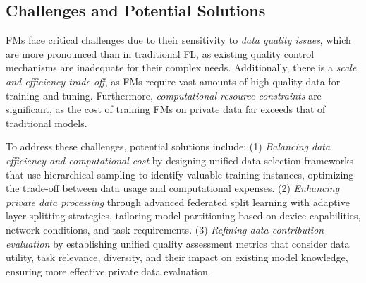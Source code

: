 \subsection{Challenges and Potential Solutions}


FMs face critical challenges due to their sensitivity to \textit{data quality issues}, which are more pronounced than in traditional FL, as existing quality control mechanisms are inadequate for their complex needs. Additionally, there is a \textit{scale and efficiency trade-off}, as FMs require vast amounts of high-quality data for training and tuning. Furthermore, \textit{computational resource constraints} are significant, as the cost of training FMs on private data far exceeds that of traditional models.

To address these challenges, potential solutions include:  
(1) \textit{Balancing data efficiency and computational cost} by designing unified data selection frameworks that use hierarchical sampling to identify valuable training instances, optimizing the trade-off between data usage and computational expenses.  
(2) \textit{Enhancing private data processing} through advanced federated split learning with adaptive layer-splitting strategies, tailoring model partitioning based on device capabilities, network conditions, and task requirements.  
(3) \textit{Refining data contribution evaluation} by establishing unified quality assessment metrics that consider data utility, task relevance, diversity, and their impact on existing model knowledge, ensuring more effective private data evaluation.